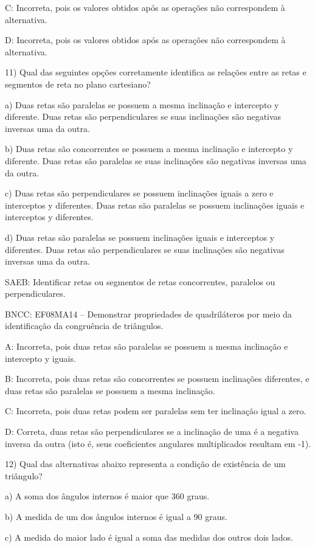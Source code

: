 C: Incorreta, pois os valores obtidos após as operações não correspondem
à alternativa.

D: Incorreta, pois os valores obtidos após as operações não correspondem
à alternativa.

11) Qual das seguintes opções corretamente identifica as relações entre
as retas e segmentos de reta no plano cartesiano?

a) Duas retas são paralelas se possuem a mesma inclinação e intercepto y
diferente. Duas retas são perpendiculares se suas inclinações são
negativas inversas uma da outra.

b) Duas retas são concorrentes se possuem a mesma inclinação e
intercepto y diferente. Duas retas são paralelas se suas inclinações são
negativas inversas uma da outra.

c) Duas retas são perpendiculares se possuem inclinações iguais a zero e
interceptos y diferentes. Duas retas são paralelas se possuem
inclinações iguais e interceptos y diferentes.

d) Duas retas são paralelas se possuem inclinações iguais e interceptos
y diferentes. Duas retas são perpendiculares se suas inclinações são
negativas inversas uma da outra.

SAEB: Identificar retas ou segmentos de retas concorrentes, paralelos ou
perpendiculares.

BNCC: EF08MA14 -- Demonstrar propriedades de quadriláteros por meio da
identificação da congruência de triângulos.

A: Incorreta, pois duas retas são paralelas se possuem a mesma
inclinação e intercepto y iguais.

B: Incorreta, pois duas retas são concorrentes se possuem inclinações
diferentes, e duas retas são paralelas se possuem a mesma inclinação.

C: Incorreta, pois duas retas podem ser paralelas sem ter inclinação
igual a zero.

D: Correta, duas retas são perpendiculares se a inclinação de uma é a
negativa inversa da outra (isto é, seus coeficientes angulares
multiplicados resultam em -1).

12) Qual das alternativas abaixo representa a condição de existência de
um triângulo?

a) A soma dos ângulos internos é maior que 360 graus.

b) A medida de um dos ângulos internos é igual a 90 graus.

c) A medida do maior lado é igual a soma das medidas dos outros dois
lados.

